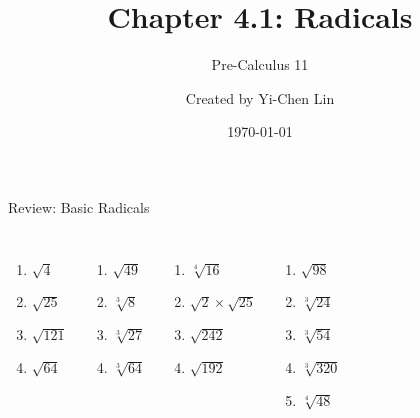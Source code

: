\documentclass[aspectratio=169]{beamer}
\title{Chapter 4.1: Radicals}
\subtitle{Pre-Calculus 11}
\author{Created by Yi-Chen Lin}
\date{\today}
\begin{document}
\begin{frame}
\titlepage
\end{frame}

\begin{frame}{Review: Basic Radicals}
\begin{tcolorbox}[colback=lightgray,colframe=primary,title=Evaluate each of the following without a calculator]
\footnotesize
\begin{columns}[T]
\begin{enumerate}
  \item $\sqrt{4}$
  \item $\sqrt{25}$
  \item $\sqrt{121}$
  \item $\sqrt{64}$
\end{enumerate}
\begin{enumerate}
  \item $\sqrt{49}$
  \item $\sqrt[3]{8}$
  \item $\sqrt[3]{27}$
  \item $\sqrt[3]{64}$
\end{enumerate}
\begin{enumerate}
  \item $\sqrt[4]{16}$
  \item $\sqrt{2} \times \sqrt{25}$
  \item $\sqrt{242}$
  \item $\sqrt{192}$
\end{enumerate}
\begin{enumerate}
  \item $\sqrt{98}$
  \item $\sqrt[3]{24}$
  \item $\sqrt[3]{54}$
  \item $\sqrt[3]{320}$
  \item $\sqrt[4]{48}$
\end{enumerate}
\end{columns}
\end{tcolorbox}
\end{frame}
\end{document}
